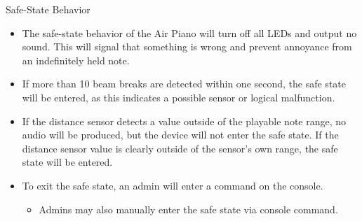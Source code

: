 \documentclass[
11pt,notheorems,hyperref={pdfauthor=whatever}
]{beamer}
\begin{document}
\begin{frame}

\begin{block}{Safe-State Behavior}
\begin{itemize}
    \item The safe-state behavior of the Air Piano
        will turn off all LEDs and output no sound.
        This will signal that something is wrong and
        prevent annoyance from an indefinitely
        held note.
    \item If more than 10 beam breaks are detected
        within one
        second, the safe state will be entered, as this
        indicates a possible sensor or logical
        malfunction.
    \item If the distance sensor detects a value
        outside of the playable note range, no audio
        will be produced, but the device will not enter
        the safe state. If the distance sensor value is
        clearly outside of the sensor's own range,
        the safe state will be entered.
    \item To exit the safe state, an admin will enter
        a command on the console.
    \begin{itemize}
        \item Admins may also manually enter the safe
        state via console command.
    \end{itemize}

\end{itemize}
\end{block}

\end{frame}
\end{document}
